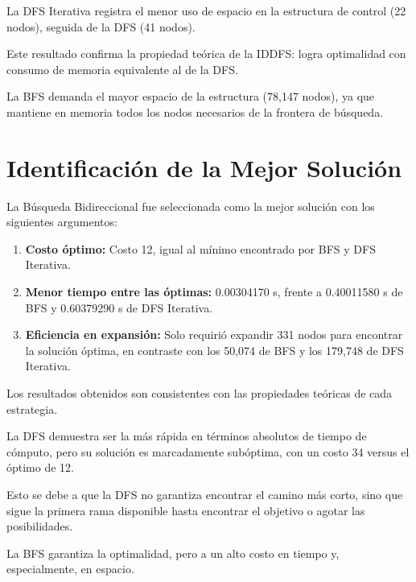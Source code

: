 \documentclass{article}
\begin{document}
La DFS Iterativa registra el menor uso de espacio en la estructura
de control (22 nodos), seguida de la DFS (41 nodos).

Este resultado confirma la propiedad teórica de la IDDFS: logra
optimalidad con consumo de memoria equivalente al de la DFS.

La BFS demanda el mayor espacio de la estructura (78,147 nodos),
ya que mantiene en memoria todos los nodos necesarios de la frontera
de búsqueda.


\section{Identificación de la Mejor Solución}

La Búsqueda Bidireccional fue seleccionada como la mejor solución con
los siguientes argumentos:

\begin{enumerate}

    \item \textbf{Costo óptimo:} Costo 12, igual al mínimo encontrado
    por BFS y DFS Iterativa.

    \item \textbf{Menor tiempo entre las óptimas:} 0.00304170 s,
    frente a 0.40011580 s de BFS y 0.60379290 s de DFS Iterativa.

    \item \textbf{Eficiencia en expansión:} Solo requirió expandir
    331 nodos para encontrar la solución óptima, en contraste con
    los 50,074 de BFS y los 179,748 de DFS Iterativa.

\end{enumerate}

Los resultados obtenidos son consistentes con las propiedades
teóricas de cada estrategia.

La DFS demuestra ser la más rápida en términos absolutos de tiempo
de cómputo, pero su solución es marcadamente subóptima, con un costo
34 versus el óptimo de 12.

Esto se debe a que la DFS no garantiza encontrar el camino más corto,
sino que sigue la primera rama disponible hasta encontrar el objetivo
o agotar las posibilidades.

La BFS garantiza la optimalidad, pero a un alto costo en tiempo y,
especialmente, en espacio.
\end{document}
